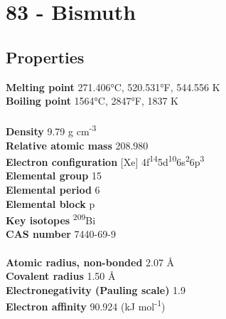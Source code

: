 \section{83 - Bismuth}
\label{sec:elem-bismuth}
\subsection{Properties}
\textbf{Melting point} 271.406°C, 520.531°F, 544.556 K\\
\textbf{Boiling point} 1564°C, 2847°F, 1837 K\\
\\
\textbf{Density} 9.79 g cm\textsuperscript{-3}\\
\textbf{Relative atomic mass} 208.980\\
\textbf{Electron configuration} [Xe] 4f\textsuperscript{14}5d\textsuperscript{10}6s\textsuperscript{2}6p\textsuperscript{3}\\
\textbf{Elemental group} 15\\
\textbf{Elemental period} 6\\
\textbf{Elemental block} p\\
\textbf{Key isotopes} \textsuperscript{209}Bi\\
\textbf{CAS number} 7440-69-9\\
\\
\textbf{Atomic radius, non-bonded} 2.07 Å\\
\textbf{Covalent radius} 1.50 Å\\
\textbf{Electronegativity (Pauling scale)} 1.9\\
\textbf{Electron affinity} 90.924 (kJ mol\textsuperscript{-1})\\